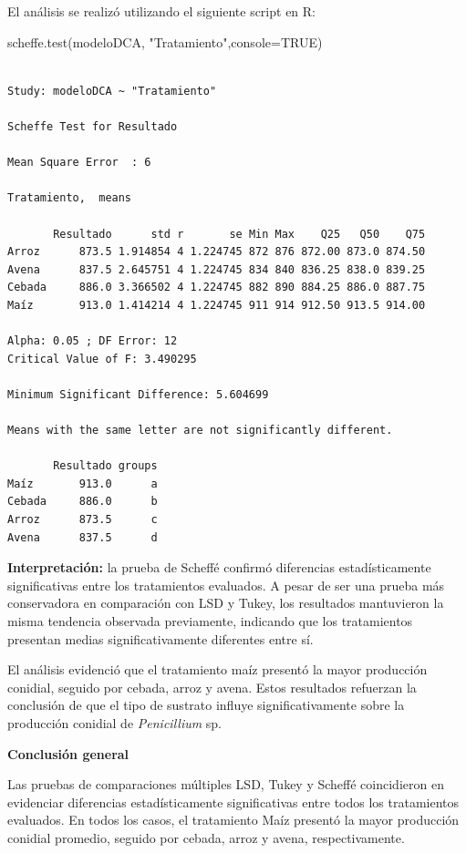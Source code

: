 \documentclass[
  spanish,
  letterpaper,
  DIV=11,
  numbers=noendperiod]{scrreprt}
\newenvironment{Shaded}{\begin{snugshade}}{\end{snugshade}}
\newcommand{\AttributeTok}[1]{\textcolor[rgb]{0.40,0.45,0.13}{#1}}
\newcommand{\ConstantTok}[1]{\textcolor[rgb]{0.56,0.35,0.01}{#1}}
\newcommand{\FunctionTok}[1]{\textcolor[rgb]{0.28,0.35,0.67}{#1}}
\newcommand{\NormalTok}[1]{\textcolor[rgb]{0.00,0.23,0.31}{#1}}
\newcommand{\StringTok}[1]{\textcolor[rgb]{0.13,0.47,0.30}{#1}}
\begin{document}
El análisis se realizó utilizando el siguiente script en R:

\begin{Shaded}
\begin{Highlighting}[]
\FunctionTok{scheffe.test}\NormalTok{(modeloDCA, }\StringTok{"Tratamiento"}\NormalTok{,}\AttributeTok{console=}\ConstantTok{TRUE}\NormalTok{)}
\end{Highlighting}
\end{Shaded}

\begin{verbatim}

Study: modeloDCA ~ "Tratamiento"

Scheffe Test for Resultado 

Mean Square Error  : 6 

Tratamiento,  means

       Resultado      std r       se Min Max    Q25   Q50    Q75
Arroz      873.5 1.914854 4 1.224745 872 876 872.00 873.0 874.50
Avena      837.5 2.645751 4 1.224745 834 840 836.25 838.0 839.25
Cebada     886.0 3.366502 4 1.224745 882 890 884.25 886.0 887.75
Maíz       913.0 1.414214 4 1.224745 911 914 912.50 913.5 914.00

Alpha: 0.05 ; DF Error: 12 
Critical Value of F: 3.490295 

Minimum Significant Difference: 5.604699 

Means with the same letter are not significantly different.

       Resultado groups
Maíz       913.0      a
Cebada     886.0      b
Arroz      873.5      c
Avena      837.5      d
\end{verbatim}

\textbf{Interpretación:} la prueba de Scheffé confirmó diferencias
estadísticamente significativas entre los tratamientos evaluados. A
pesar de ser una prueba más conservadora en comparación con LSD y Tukey,
los resultados mantuvieron la misma tendencia observada previamente,
indicando que los tratamientos presentan medias significativamente
diferentes entre sí.

El análisis evidenció que el tratamiento maíz presentó la mayor
producción conidial, seguido por cebada, arroz y avena. Estos resultados
refuerzan la conclusión de que el tipo de sustrato influye
significativamente sobre la producción conidial de \emph{Penicillium}
sp.

\textbf{Conclusión general}

Las pruebas de comparaciones múltiples LSD, Tukey y Scheffé coincidieron
en evidenciar diferencias estadísticamente significativas entre todos
los tratamientos evaluados. En todos los casos, el tratamiento Maíz
presentó la mayor producción conidial promedio, seguido por cebada,
arroz y avena, respectivamente.
\end{document}
